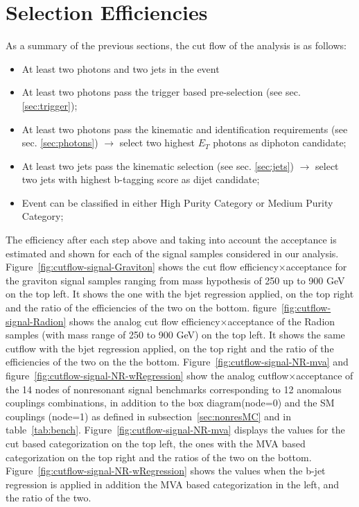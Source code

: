 \section{Selection Efficiencies}
\label{sec:selection}

As a summary of the previous sections, the cut flow of the analysis is as follows:
\begin{itemize}
\item At least two photons and two jets in the event
\item At least two photons pass the trigger based pre-selection (see sec. \ref{sec:trigger});
\item At least two photons pass the kinematic and identification requirements (see sec. \ref{sec:photons}) $\to$ select two highest $E_{T}$ photons as diphoton candidate;
\item At least two jets pass the kinematic selection (see sec. \ref{sec:jets}) $\to$ select two jets with highest b-tagging score as dijet candidate;
\item Event can be classified in either High Purity Category or Medium Purity Category;
\end{itemize}

The efficiency after each step above and taking into account the acceptance is estimated and shown for each of the signal samples considered in our analysis. Figure~\ref{fig:cutflow-signal-Graviton} shows the cut flow efficiency$\times$acceptance  for the graviton signal samples ranging from mass hypothesis of 250 up to 900 GeV on the top left. It shows the one with the bjet regression applied, on the top right and the ratio of the efficiencies of the two on the bottom.
figure~\ref{fig:cutflow-signal-Radion} shows the analog cut flow efficiency$\times$acceptance of the Radion samples (with mass range of 250 to 900 GeV) on the top left. It shows the same cutflow with the bjet regression applied, on the top right and the ratio of the efficiencies of the two on the the bottom.
Figure~\ref{fig:cutflow-signal-NR-mva} and figure~\ref{fig:cutflow-signal-NR-wRegression}  show the analog cutflow$\times$acceptance of the 14 nodes of  nonresonant signal  benchmarks corresponding to  12 anomalous couplings  combinations, in addition to the box diagram(node=0) and the SM couplings (node=1) as defined in  subsection~\ref{sec:nonresMC} and in table~\ref{tab:bench}. Figure~\ref{fig:cutflow-signal-NR-mva} displays the values for the cut based categorization on the top left, the ones with the MVA based categorization on the top right and the ratios of the two on the bottom. Figure~\ref{fig:cutflow-signal-NR-wRegression} shows the values when the b-jet regression is applied in addition the MVA based categorization in the left, and the ratio of the two.


